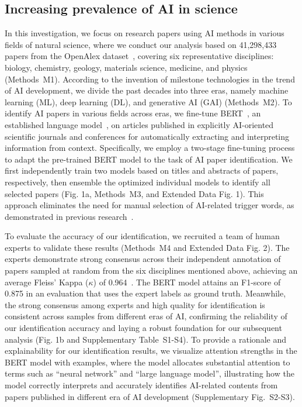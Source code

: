 \subsection*{Increasing prevalence of AI in science}
In this investigation, we focus on research papers using AI methods in various fields of natural science, where we conduct our analysis based on 41,298,433 papers from the OpenAlex dataset~\supercite{openalex}, covering six representative disciplines: biology, chemistry, geology, materials science, medicine, and physics (Methods~M1).
According to the invention of milestone technologies in the trend of AI development, we divide the past decades into three eras, namely machine learning (ML), deep learning (DL), and generative AI (GAI) (Methods~M2).
To identify AI papers in various fields across eras, we fine-tune BERT~\supercite{DBLP:conf/naacl/DevlinCLT19,wolf-etal-2020-transformers}, an established language model~\supercite{DBLP:conf/emnlp/BeltagyLC19,DBLP:conf/acl/CohanFBDW20,DBLP:conf/emnlp/SinghDCDF23}, on articles published in explicitly AI-oriented scientific journals and conferences for automatically extracting and interpreting information from context.
Specifically, we employ a two-stage fine-tuning process to adapt the pre-trained BERT model to the task of AI paper identification.
We first independently train two models based on titles and abstracts of papers, respectively, then ensemble the optimized individual models to identify all selected papers (Fig. 1a, Methods~M3, and Extended Data Fig. 1).
This approach eliminates the need for manual selection of AI-related trigger words, as demonstrated in previous research~\supercite{frank2019evolution}.

To evaluate the accuracy of our identification, we recruited a team of human experts to validate these results (Methods~M4 and Extended Data Fig. 2).
The experts demonstrate strong consensus across their independent annotation of papers sampled at random from the six disciplines mentioned above, achieving an average Fleiss’ Kappa ($\kappa$) of 0.964~\supercite{landis1977measurement,fleiss1971measuring}. The BERT model attains an F1-score of 0.875 in an evaluation that uses the expert labels as ground truth.
Meanwhile, the strong consensus among experts and high quality for identification is consistent across samples from different eras of AI, confirming the reliability of our identification accuracy and laying a robust foundation for our subsequent analysis (Fig. 1b and Supplementary Table~S1-S4).
To provide a rationale and explainability for our identification results, we visualize attention strengths in the BERT model with examples, where the model allocates substantial attention to terms such as “neural network” and “large language model”, illustrating how the model correctly interprets and accurately identifies AI-related contents from papers published in different era of AI development (Supplementary Fig.~S2-S3).

